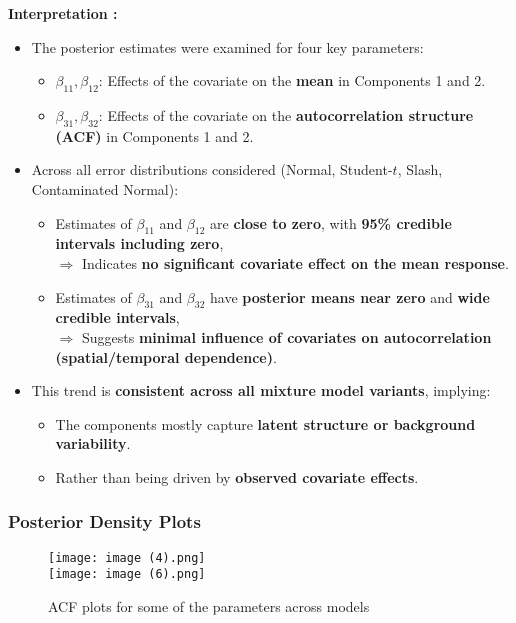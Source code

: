 \documentclass[10.5pt]{article} %
\begin{document}
\textbf{Interpretation :}
\begin{itemize}
    \item The posterior estimates were examined for four key parameters:
    \begin{itemize}
        \item \( \beta_{11}, \beta_{12} \): Effects of the covariate on the \textbf{mean} in Components 1 and 2.
        \item \( \beta_{31}, \beta_{32} \): Effects of the covariate on the \textbf{autocorrelation structure (ACF)} in Components 1 and 2.
    \end{itemize}
    
    \item Across all error distributions considered (Normal, Student-\( t \), Slash, Contaminated Normal):
    \begin{itemize}
        \item Estimates of \( \beta_{11} \) and \( \beta_{12} \) are \textbf{close to zero}, with \textbf{95\% credible intervals including zero},\\
        \(\Rightarrow\) Indicates \textbf{no significant covariate effect on the mean response}.
        
        \item Estimates of \( \beta_{31} \) and \( \beta_{32} \) have \textbf{posterior means near zero} and \textbf{wide credible intervals},\\
        \(\Rightarrow\) Suggests \textbf{minimal influence of covariates on autocorrelation (spatial/temporal dependence)}.
    \end{itemize}
    
    \item This trend is \textbf{consistent across all mixture model variants}, implying:
    \begin{itemize}
        \item The components mostly capture \textbf{latent structure or background variability}.
        \item Rather than being driven by \textbf{observed covariate effects}.
    \end{itemize}
\end{itemize}

\subsubsection{Posterior Density Plots}

\begin{figure}[H]
    \centering
    \texttt{[image: image (4).png]} \\
    \vspace{1.2em}
    \texttt{[image: image (6).png]}
    \caption{ACF plots for some of the parameters across models}
    \label{fig:vertical_images}
\end{figure}
\end{document}
